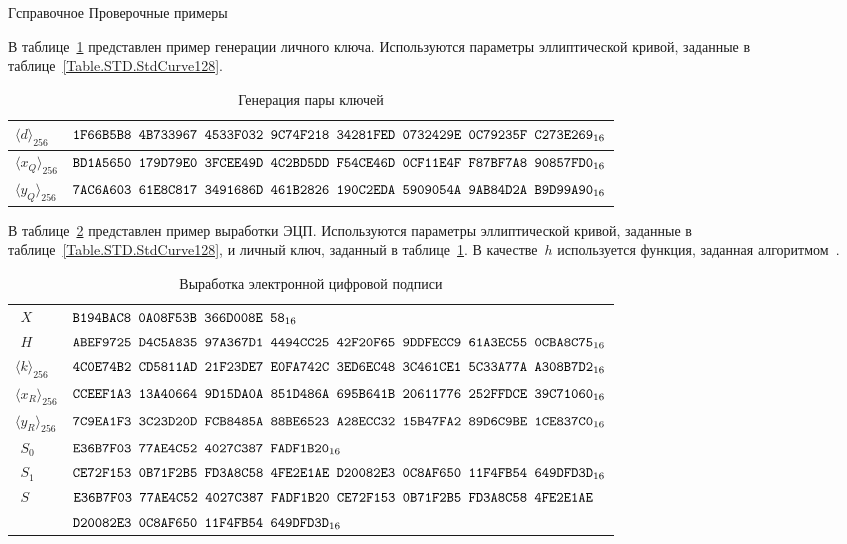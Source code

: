 \begin{appendix}{Г}{справочное}
{Проверочные примеры}
\label{TEST}

\label{TEST.GenKeyPair}

В таблице~\ref{Table.TEST.GenKeyPair} представлен пример генерации личного ключа.
Используются параметры эллиптической кривой, 
заданные в таблице~\ref{Table.STD.StdCurve128}. 

\begin{table}[!h]
\caption{Генерация пары ключей}\label{Table.TEST.GenKeyPair}
{\small
\begin{tabular}{|l|l|}
\hline
$\langle d\rangle_{256}$ & 
$\texttt{1F66B5B8~4B733967~4533F032~9C74F218~34281FED~0732429E~0C79235F~C273E269}_{16}$\\
%
\hline
$\langle x_Q\rangle_{256}$ & 
$\texttt{BD1A5650~179D79E0~3FCEE49D~4C2BD5DD~F54CE46D~0CF11E4F~F87BF7A8~90857FD0}_{16}$\\
%
\hline
$\langle y_Q\rangle_{256}$ & 
$\texttt{7AC6A603~61E8C817~3491686D~461B2826~190C2EDA~5909054A~9AB84D2A~B9D99A90}_{16}$\\
%
\hline
\end{tabular}
}
\end{table}

\label{TEST.Sign}

В таблице~\ref{Table.TEST.Sign} представлен пример выработки ЭЦП.
%
Используются параметры эллиптической кривой, 
заданные в таблице~\ref{Table.STD.StdCurve128},
и личный ключ, заданный в таблице~\ref{Table.TEST.GenKeyPair}. 
%
В качестве~$h$ используется функция,
заданная алгоритмом~.

\begin{table}[!h]
\caption{Выработка электронной цифровой подписи}\label{Table.TEST.Sign}
{\small
\begin{tabular}{|l|l|}
\hline
$\phantom{\langle}X$ & 
$\texttt{B194BAC8~0A08F53B~366D008E~58}_{16}$\\
%
\dhline
$\phantom{\langle}H$ & 
$\texttt{ABEF9725~D4C5A835~97A367D1~4494CC25~42F20F65~9DDFECC9~61A3EC55~0CBA8C75}_{16}$\\
%
\hline
$\langle k\rangle_{256}$ & 
$\texttt{4C0E74B2~CD5811AD~21F23DE7~E0FA742C~3ED6EC48~3C461CE1~5C33A77A~A308B7D2}_{16}$\\
%
\hline
$\langle x_R\rangle_{256}$ & 
$\texttt{CCEEF1A3~13A40664~9D15DA0A~851D486A~695B641B~20611776~252FFDCE~39C71060}_{16}$\\
%
\hline
$\langle y_R\rangle_{256}$ & 
$\texttt{7C9EA1F3~3C23D20D~FCB8485A~88BE6523~A28ECC32~15B47FA2~89D6C9BE~1CE837C0}_{16}$\\
%
\hline
$\phantom{\langle}S_0$ & 
$\texttt{E36B7F03~77AE4C52~4027C387~FADF1B20}_{16}$\\
%
\hline
$\phantom{\langle}S_1$ & 
$\texttt{CE72F153~0B71F2B5~FD3A8C58~4FE2E1AE~D20082E3~0C8AF650~11F4FB54~649DFD3D}_{16}$\\
%
\dhline
$\phantom{\langle}S$ & 
$\texttt{E36B7F03~77AE4C52~4027C387~FADF1B20~CE72F153~0B71F2B5~FD3A8C58~4FE2E1AE}$\\
& 
$\texttt{D20082E3~0C8AF650~11F4FB54~649DFD3D}_{16}$\\
\hline
\end{tabular}
}
\end{table}


\end{appendix}
